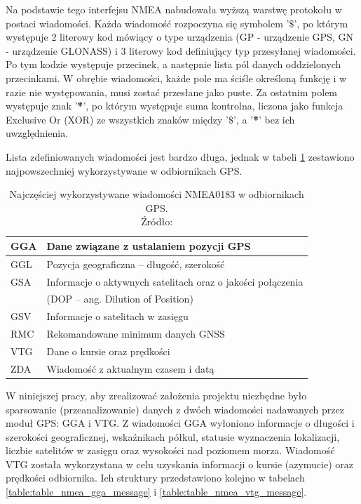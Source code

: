 Na podstawie tego interfejsu NMEA nabudowała wyższą warstwę protokołu w postaci wiadomości. Każda wiadomość rozpoczyna się symbolem '\textbf{$\$$}', po którym występuje 2 literowy kod mówiący o type urządzenia (GP - urządzenie GPS, GN - urządzenie GLONASS) i 3 literowy kod definiujący typ przesyłanej wiadomości. Po tym kodzie występuje przecinek, a następnie lista pól danych oddzielonych przecinkami. W obrębie wiadomości, każde pole ma ściśle określoną funkcję i w razie nie występowania, musi zostać przesłane jako puste. Za ostatnim polem występuje znak '\textbf{*}', po którym występuje suma kontrolna, liczona jako funkcja Exclusive Or (XOR) ze wszystkich znaków między '\textbf{$\$$}', a '\textbf{*}' bez ich uwzględnienia. 

Lista zdefiniowanych wiadomości jest bardzo długa, jednak w tabeli \ref{table:table_nmea_messages} zestawiono najpowszechniej wykorzystywane w odbiornikach GPS.

\begin{table}[H]
\centering
\caption{Najczęściej wykorzystywane wiadomości NMEA0183 w odbiornikach GPS.\\ Źródło: \cite{inzynierka}}
\label{table:table_nmea_messages}
\begin{tabular}{| l | l |}
\hline
GGA & Dane związane z ustalaniem pozycji GPS \\  \hline
GGL & Pozycja geograficzna – długość, szerokość \\  \hline
GSA & Informacje o aktywnych satelitach oraz o jakości połączenia \\ 
    & (DOP – ang.    Dilution of Position) \\ \hline
GSV & Informacje o satelitach w zasięgu \\ \hline
RMC & Rekomandowane minimum danych GNSS \\ \hline
VTG & Dane o kursie oraz prędkości \\ \hline
ZDA & Wiadomość z aktualnym czasem i datą \\ \hline
\end{tabular}
\end{table}

W niniejszej pracy, aby zrealizować założenia projektu niezbędne było sparsowanie (przeanalizowanie) danych z dwóch wiadomości nadawanych przez moduł GPS: GGA i VTG.
Z wiadomości GGA  wyłoniono informacje o długości i szerokości geograficznej, wskaźnikach półkul, statusie wyznaczenia lokalizacji, liczbie satelitów w zasięgu oraz wysokości nad poziomem morza. Wiadomość VTG została wykorzystana w celu uzyskania informacji o kursie (azymucie) oraz prędkości odbiornika. Ich struktury przedstawiono kolejno w tabelach \ref{table:table_nmea_gga_message} i \ref{table:table_nmea_vtg_message}.

